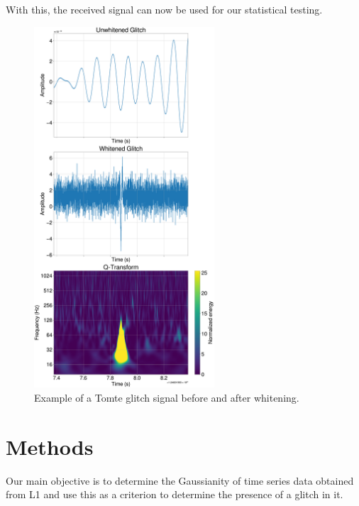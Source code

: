 \documentclass[12pt]{article}
\begin{document}
\medskip
\noindent With this, the received signal can now be used for our statistical testing.

\begin{figure}[H]
  \centering
  \includegraphics[width=0.6\textwidth]{images/sample_plot.pdf}
  \caption{Example of a Tomte glitch signal before and after whitening.}
  \label{fig:sampletomte}
\end{figure}

\section{Methods}\label{Methods}


Our main objective is to determine the Gaussianity of time series data obtained from L1 and use this as a criterion to determine the presence of a glitch in it. 
\end{document}
